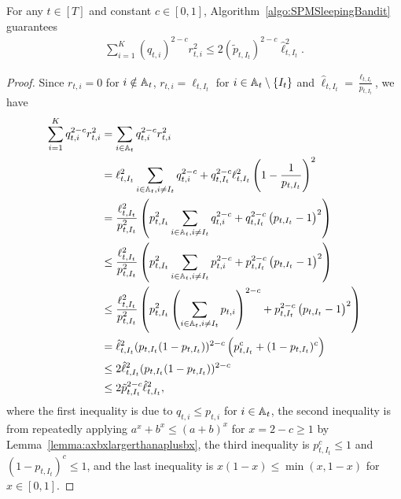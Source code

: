 \begin{lemma}
    For any $t \in [T]$ and constant $c \in [0,1]$, Algorithm~\ref{algo:SPMSleepingBandit} guarantees
    \begin{align*}
        \sum_{i=1}^K (q_{t,i})^{2-c} r_{t,i}^2 \leq 2(\tilde{p}_{t,I_t})^{2-c}\hat{\ell}_{t,I_t}^2.
    \end{align*}
    \label{lemma:boundqtirtibypItellIt}
\end{lemma}
\begin{proof}
    Since $r_{t,i} = 0$ for $i \notin {\mathbb{A}}_t$, $r_{t,i} = \ell_{t,I_t}$ for $i \in {\mathbb{A}}_t \setminus \{I_t\}$ and $\hat{\ell}_{t,I_t} = \frac{\ell_{t,I_t}}{p_{t,I_t}}$, we have
    \begin{align*}
        \sum_{i=1}^K {q}_{t,i}^{2-c} r_{t,i}^2 &= \sum_{i \in {\mathbb{A}}_t} {q}_{t,i}^{2-c} r_{t,i}^2  \\
        &= \ell_{t,I_t}^2 \sum_{i \in {\mathbb{A}}_t, i \neq I_t}{q}_{t,i}^{2-c} + {q}_{t,I_t}^{2-c}\ell_{t,I_t}^2\left(1 - \frac{1}{p_{t,I_t}}\right)^2 \\
        &= \frac{\ell_{t,I_t}^2}{p_{t,I_t}^2}\left(p_{t,I_t}^2\sum_{i \in {\mathbb{A}}_t, i \neq I_t}{q}_{t,i}^{2-c} + {q}_{t,I_t}^{2-c} \left(p_{t,I_t} - 1\right)^2\right) \\
        &\leq \frac{\ell_{t,I_t}^2}{p_{t,I_t}^2}\left(p_{t,I_t}^2\sum_{i \in {\mathbb{A}}_t, i \neq I_t}p_{t,i}^{2-c} + p_{t,I_t}^{2-c} \left(p_{t,I_t} - 1\right)^2\right) \\
        &\leq \frac{\ell_{t,I_t}^2}{p_{t,I_t}^2}\left(p_{t,I_t}^2\left(\sum_{i \in {\mathbb{A}}_t, i \neq I_t}p_{t,i}\right)^{2-c} + p_{t,I_t}^{2-c} \left(p_{t,I_t} - 1\right)^2\right) \\
        &= \hat{\ell}_{t,I_t}^2 (p_{t,I_t}(1-p_{t,I_t}))^{2-c}\left(p_{t,I_t}^c + (1-p_{t,I_t})^c\right) \\
        &\leq 2\hat{\ell}_{t,I_t}^2 (p_{t,I_t}(1-p_{t,I_t}))^{2-c} \\
        &\leq 2\tilde{p}_{t,I_t}^{2-c}\hat{\ell}_{t,I_t}^2,
    \end{align*}
    where the first inequality is due to $q_{t,i} \leq p_{t,i}$ for $i \in {\mathbb{A}}_t$, the second inequality is from repeatedly applying $a^x + b^x \leq (a+b)^x$ for $x = 2 - c \geq 1$ by Lemma~\ref{lemma:axbxlargerthanaplusbx}, the third inequality is $p_{t,I_t}^c \leq 1$ and $(1-p_{t,I_t})^c \leq 1$, and the last inequality is $x(1-x) \leq \min(x, 1-x)$ for $x \in [0,1]$.
\end{proof}

